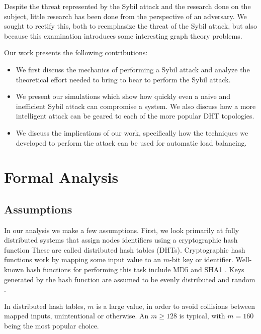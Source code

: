 \documentclass[a4paper]{article}
\begin{document}
Despite the threat represented by the Sybil attack and the research done on the subject, little research has been done from the perspective of an adversary.
We sought to rectify this, both to reemphasize the threat of the Sybil attack, but also because this examination introduces some interesting graph theory problems.

Our work presents the following contributions:
\begin{itemize}
    \item We first discuss the mechanics of performing a Sybil attack and analyze the theoretical effort needed to bring to bear to perform the Sybil attack.
    \item We present our simulations which show how quickly even a naive and inefficient Sybil attack can compromise a system.  We also discuss how a more intelligent attack can be geared to each of the more popular DHT topologies.
    \item We discuss the implications of our work, specifically how the techniques we developed to perform the attack can be used for automatic load balancing.

\end{itemize}

\section{Formal Analysis}




\subsection{Assumptions}
In our analysis we make a few assumptions. 
First, we look primarily at fully distributed systems that assign nodes identifiers using a cryptographic hash function
These are called distributed hash tables (DHTs).
Cryptographic hash functions work by mapping some input value to an $m$-bit key or identifier.
Well-known hash functions for performing this task include MD5 \cite{md5} and SHA1 \cite{sha1}.
Keys generated by the hash function are assumed to be evenly distributed and random \cite{bellare2004hash}. 

In distributed hash tables, $m$ is a large value, in order to avoid collisions between mapped inputs, unintentional or otherwise. 
An $m \geq 128$ is typical, with $m = 160$ being the most popular choice.
\end{document}
